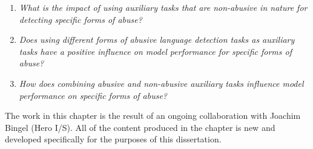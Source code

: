\begin{center}
\begin{minipage}{0.9\textwidth}
\vspace{5mm}
    \begin{enumerate}[start=6, label={\textbf{RQ \arabic*}}]
        \item{\textit{What is the impact of using auxiliary tasks that are non-abusive in nature for detecting specific forms of abuse?}}
        \item{\textit{Does using different forms of abusive language detection tasks as auxiliary tasks have a positive influence on model performance for specific forms of abuse?}}
        \item{\textit{How does combining abusive and non-abusive auxiliary tasks influence model performance on specific forms of abuse?}}
    \end{enumerate}
    \vspace{5mm}
\end{minipage}
\end{center}

The work in this chapter is the result of an ongoing collaboration with Joachim Bingel (Hero I/S).
All of the content produced in the chapter is new and developed specifically for the purposes of this dissertation.\vspace{5mm}

